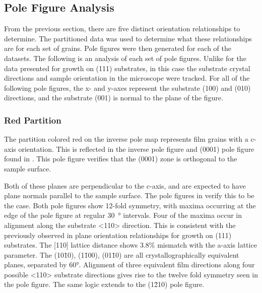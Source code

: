 \subsection{Pole Figure Analysis}
\label{subsec:single.growth.polefigureanalysis}


From the previous section, there are five distinct orientation relationships to determine. The partitioned data was used to determine what these relationships are for each set of grains. Pole figures were then generated for each of the datasets. The following is an analysis of each set of pole figures. Unlike for the data presented for growth on (111) substrates, in this case the substrate crystal directions and sample orientation in the microscope were tracked. For all of the following pole figures, the x- and y-axes represent the substrate (100) and (010) directions, and the substrate (001) is normal to the plane of the figure.


\subsubsection{Red Partition}
\label{subsubsec:single.growth.red}


The partition colored red on the inverse pole map represents film grains with a c-axis orientation. This is reflected in the inverse pole figure and (0001) pole figure found in . This pole figure verifies that the (0001) zone is orthogonal to the sample surface. 

Both of these planes are perpendicular to the c-axis, and are expected to have plane normals parallel to the sample surface. The pole figures in  verify this to be the case. Both pole figures show 12-fold symmetry, with maxima occurring at the edge of the pole figure at regular \SI{30}{\degree} intervals. Four of the maxima occur in alignment along the substrate <110> direction. This is consistent with the previously observed in plane orientation relationships for growth on (111) substrates. The  [110] lattice distance shows 3.8\% mismatch with the  a-axis lattice parameter. The (10\={1}0), (1\={1}00),  (01\={1}0) are all crystallographically equivalent planes, separated by 60\si{\degree}. Alignment of three equivalent film directions along four possible <110> substrate directions gives rise to the twelve fold symmetry seen in the pole figure. The same logic extends to the (1\={2}10) pole figure.

